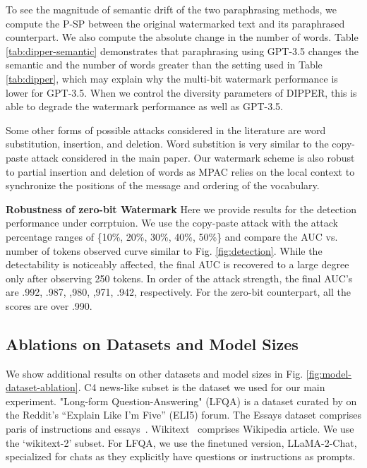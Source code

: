To see the magnitude of semantic drift of the two paraphrasing methods, we compute the P-SP between the original watermarked text and its paraphrased counterpart. We also compute the absolute change in the number of words. Table \ref{tab:dipper-semantic} demonstrates that paraphrasing using GPT-3.5 changes the semantic and the number of words greater than the setting used in Table \ref{tab:dipper}, which may explain why the multi-bit watermark performance is lower for GPT-3.5. When we control the diversity parameters of DIPPER, this is able to degrade the watermark performance as well as GPT-3.5.

Some other forms of possible attacks considered in the literature are word substitution, insertion, and deletion. Word substition is very similar to the copy-paste attack considered in the main paper. Our watermark scheme is also robust to partial insertion and deletion of words as MPAC relies on the local context to synchronize the positions of the message and ordering of the vocabulary. 

\noindent\textbf{Robustness of zero-bit Watermark} Here we provide results for the detection performance under corrptuion. We use the copy-paste attack with the attack percentage ranges of \{10\%, 20\%, 30\%, 40\%, 50\%\} and compare the AUC vs. number of tokens observed curve similar to Fig. \ref{fig:detection}. While the detectability is noticeably affected, the final AUC is recovered to a large degree only after observing 250 tokens. In order of the attack strength, the final AUC's are .992, .987, ,980, ,971, .942, respectively.  For the zero-bit counterpart, all the scores are over .990.



\subsection{Ablations on Datasets and Model Sizes}\label{appendix:models} 
We show additional results on other datasets and model sizes in Fig. \ref{fig:model-dataset-ablation}. C4 news-like subset is the dataset we used for our main experiment. "Long-form Question-Answering" (LFQA) is a dataset curated by \citet{krishna2023paraphrasing} on the Reddit’s “Explain Like I’m Five” (ELI5) forum. The Essays dataset comprises paris of instructions and essays~\citep{essay}. Wikitext~\citep{merity2016pointer} comprises Wikipedia article. We use the `wikitext-2' subset. For LFQA, we use the finetuned version, LLaMA-2-Chat, specialized for chats as they explicitly have questions or instructions as prompts.

